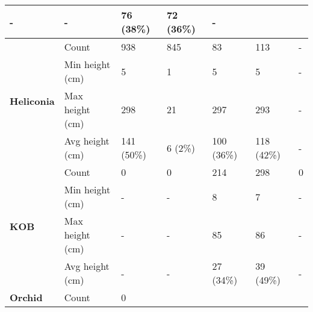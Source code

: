 \begin{longtable}{|p{2cm}|p{2cm}|p{1.5cm}|p{1.5cm}|p{1.5cm}|p{1.5cm}|p{1.5cm}|}
						\multicolumn{1}{l|}{-} & 
						\multicolumn{1}{l|}{-} &
						\multicolumn{1}{l|}{76 (38\%)} & 
						\multicolumn{1}{l|}{72 (36\%)} & 
						\multicolumn{1}{l|}{-} \\\cline{2-7}
		\hline      
		\multirow{4}{*}{\textbf{Heliconia}} & 
						\multicolumn{1}{l|}{Count} & 
						\multicolumn{1}{l|}{938} & 
						\multicolumn{1}{l|}{845} &
						\multicolumn{1}{l|}{83} & 
						\multicolumn{1}{l|}{113} &
						\multicolumn{1}{l|}{-} \\\cline{2-7} &
						\multicolumn{1}{l|}{Min height (cm)} & 
						\multicolumn{1}{l|}{5} & 
						\multicolumn{1}{l|}{1} &
						\multicolumn{1}{l|}{5} & 
						\multicolumn{1}{l|}{5} &
						\multicolumn{1}{l|}{-} \\\cline{2-7} &
						\multicolumn{1}{l|}{Max height (cm)} & 
						\multicolumn{1}{l|}{298} & 
						\multicolumn{1}{l|}{21} &
						\multicolumn{1}{l|}{297} & 
						\multicolumn{1}{l|}{293} &
						\multicolumn{1}{l|}{-} \\\cline{2-7} &
						\multicolumn{1}{l|}{Avg height (cm)} & 
						\multicolumn{1}{l|}{141 (50\%)} & 
						\multicolumn{1}{l|}{6 (2\%)} &
						\multicolumn{1}{l|}{100 (36\%)} & 
						\multicolumn{1}{l|}{118 (42\%)} & 
						\multicolumn{1}{l|}{-} \\\cline{2-7}
		\hline      
		\multirow{4}{*}{\textbf{KOB}} & 
						\multicolumn{1}{l|}{Count} & 
						\multicolumn{1}{l|}{0} & 
						\multicolumn{1}{l|}{0} &
						\multicolumn{1}{l|}{214} & 
						\multicolumn{1}{l|}{298} &
						\multicolumn{1}{l|}{0} \\\cline{2-7} &
						\multicolumn{1}{l|}{Min height (cm)} & 
						\multicolumn{1}{l|}{-} & 
						\multicolumn{1}{l|}{-} &
						\multicolumn{1}{l|}{8} & 
						\multicolumn{1}{l|}{7} &
						\multicolumn{1}{l|}{-} \\\cline{2-7} &
						\multicolumn{1}{l|}{Max height (cm)} & 
						\multicolumn{1}{l|}{-} & 
						\multicolumn{1}{l|}{-} &
						\multicolumn{1}{l|}{85} & 
						\multicolumn{1}{l|}{86} &
						\multicolumn{1}{l|}{-} \\\cline{2-7} &
						\multicolumn{1}{l|}{Avg height (cm)} & 
						\multicolumn{1}{l|}{-} & 
						\multicolumn{1}{l|}{-} &
						\multicolumn{1}{l|}{27 (34\%)} & 
						\multicolumn{1}{l|}{39 (49\%)} & 
						\multicolumn{1}{l|}{-} \\\cline{2-7}
		\hline     
		\multirow{4}{*}{\textbf{Orchid}} & 
						\multicolumn{1}{l|}{Count} & 
						\multicolumn{1}{l|}{0} & 

\end{longtable}
